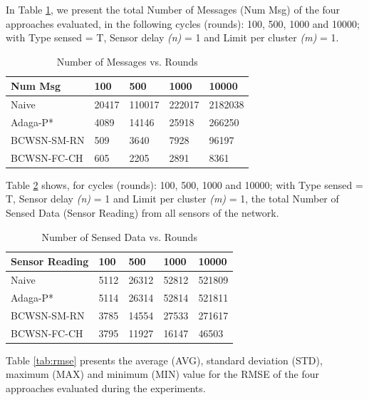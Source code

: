 \documentclass[conference]{IEEEtran}
\begin{document}
In Table \ref{tab:numMsgVsRounds}, we present the total Number of Messages (Num Msg)
of the four approaches evaluated, in the following cycles (rounds): 100, 500,
1000 and 10000; with Type sensed = T, Sensor delay {\it(n)} = 1 and Limit per
cluster {\it(m)} = 1.

\begin{table}[h!]
\caption{Number of Messages vs. Rounds}
\label{tab:numMsgVsRounds}
\begin{center}
\begin{tabular}{|l||l|l|l|l|}
\hline
Num Msg &100 &500 &1000 &10000 \\
\hline\hline
Naive &20417 &110017 &222017 &2182038 \\
\hline
Adaga-P* &4089 &14146 &25918 &266250 \\
\hline
BCWSN-SM-RN &509 &3640 &7928 &96197 \\
\hline
BCWSN-FC-CH &605 &2205 &2891 &8361 \\
\hline
\end{tabular}
\end{center}
\end{table}

Table \ref{tab:sensReadVsRounds} shows, for cycles (rounds): 100, 500, 1000 and
10000; with Type sensed = T, Sensor delay {\it(n)} = 1 and Limit per cluster
{\it(m)} = 1, the total Number of Sensed Data (Sensor Reading) from all sensors
of the network.

\begin{table}[h!]
\caption{Number of Sensed Data vs. Rounds}
\label{tab:sensReadVsRounds}
\begin{center}
\begin{tabular}{|l||l|l|l|l|}
\hline
Sensor Reading &100 &500 &1000 &10000 \\
\hline\hline
Naive &5112 &26312 &52812 &521809 \\
\hline
Adaga-P* &5114 &26314 &52814 &521811 \\
\hline
BCWSN-SM-RN &3785 &14554 &27533 &271617 \\
\hline
BCWSN-FC-CH &3795 &11927 &16147 &46503 \\
\hline
\end{tabular}
\end{center}
\end{table}


Table \ref{tab:rmse} presents the average (AVG), standard deviation (STD),
maximum (MAX) and minimum (MIN) value for the RMSE of the four approaches
evaluated during the experiments.
\end{document}
